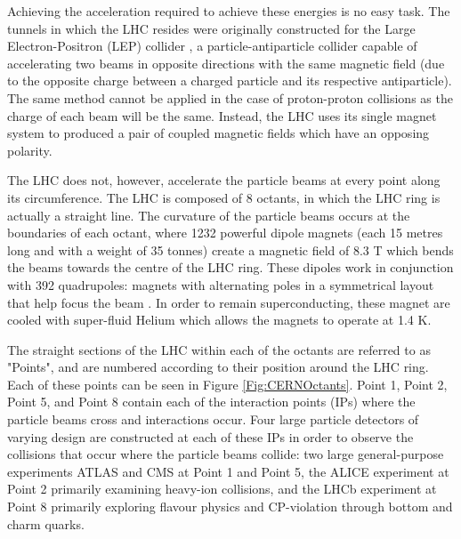 \documentclass[12pt,a4paper,epsf,portrait,times,epsfig]{report}
\begin{document}
		Achieving the acceleration required to achieve these energies is no easy task. The tunnels in which the LHC resides were originally constructed for the Large Electron-Positron (LEP) collider \cite{LEPHistory, LEPDesign1, LEPDesign2, LEPDesign3}, a particle-antiparticle collider capable of accelerating two beams in opposite directions with the same magnetic field (due to the opposite charge between a charged particle and its respective antiparticle). The same method cannot be applied in the case of proton-proton collisions as the charge of each beam will be the same. Instead, the LHC uses its single magnet system to produced a pair of coupled magnetic fields which have an opposing polarity. \par

		The LHC does not, however, accelerate the particle beams at every point along its circumference. The LHC is composed of 8 octants, in which the LHC ring is actually a straight line. The curvature of the particle beams occurs at the boundaries of each octant, where 1232 powerful dipole magnets (each 15 metres long and with a weight of 35 tonnes) create a magnetic field of 8.3 T which bends the beams towards the centre of the LHC ring. These dipoles work in conjunction with 392 quadrupoles: magnets with alternating poles in a symmetrical layout that help focus the beam \cite{LHCMagnets}. In order to remain superconducting, these magnet are cooled with super-fluid Helium which allows the magnets to operate at 1.4 K. \par

		The straight sections of the LHC within each of the octants are referred to as "Points", and are numbered according to their position around the LHC ring. Each of these points can be seen in Figure \ref{Fig:CERNOctants}. Point 1, Point 2, Point 5, and Point 8 contain each of the interaction points (IPs) where the particle beams cross and interactions occur. Four large particle detectors of varying design are constructed at each of these IPs in order to observe the collisions that occur where the particle beams collide: two large general-purpose experiments ATLAS \cite{ATLAS_Collab} and CMS \cite{CMSCollab} at Point 1 and Point 5, the ALICE \cite{ALICECollab} experiment at Point 2 primarily examining heavy-ion collisions, and the LHCb \cite{LHCCollab} experiment at Point 8 primarily exploring flavour physics and CP-violation through bottom and charm quarks. \par
\end{document}
